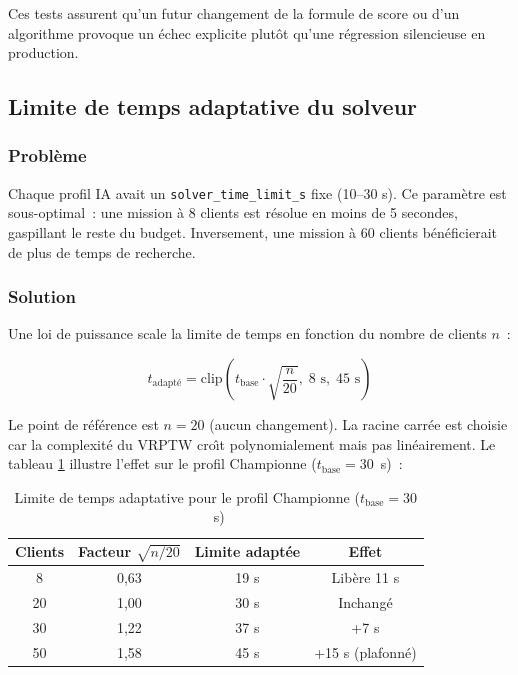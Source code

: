 \documentclass[a4paper, 12pt, twoside]{article}
\begin{document}
Ces tests assurent qu'un futur changement de la formule de score ou d'un algorithme provoque un \'{e}chec explicite plut\^{o}t qu'une r\'{e}gression silencieuse en production.

\subsection{Limite de temps adaptative du solveur}

\subsubsection{Probl\`{e}me}

Chaque profil IA avait un \texttt{solver\_time\_limit\_s} fixe (10--30 s). Ce param\`{e}tre est sous-optimal~: une mission \`{a} 8 clients est r\'{e}solue en moins de 5 secondes, gaspillant le reste du budget. Inversement, une mission \`{a} 60 clients b\'{e}n\'{e}ficierait de plus de temps de recherche.

\subsubsection{Solution}

Une loi de puissance scale la limite de temps en fonction du nombre de clients $n$~:

\[
t_{\text{adapt\'{e}}} = \text{clip}\!\left(t_{\text{base}} \cdot \sqrt{\frac{n}{20}},\; 8\text{ s},\; 45\text{ s}\right)
\]

Le point de r\'{e}f\'{e}rence est $n = 20$ (aucun changement). La racine carr\'{e}e est choisie car la complexit\'{e} du VRPTW cro\^{\i}t polynomialement mais pas lin\'{e}airement. Le tableau \ref{tab:adaptive} illustre l'effet sur le profil Championne ($t_{\text{base}} = 30$~s)~:

\begin{table}[h]
\begin{center}
\begin{tabular}{|c|c|c|c|}
\hline
\textbf{Clients} & \textbf{Facteur} $\sqrt{n/20}$ & \textbf{Limite adapt\'{e}e} & \textbf{Effet} \\
\hline
8 & 0,63 & 19 s & Lib\`{e}re 11 s \\
\hline
20 & 1,00 & 30 s & Inchang\'{e} \\
\hline
30 & 1,22 & 37 s & +7 s \\
\hline
50 & 1,58 & 45 s & +15 s (plafonn\'{e}) \\
\hline
\end{tabular}
\end{center}
\caption{Limite de temps adaptative pour le profil Championne ($t_{\text{base}} = 30$~s)}
\label{tab:adaptive}
\end{table}
\end{document}
